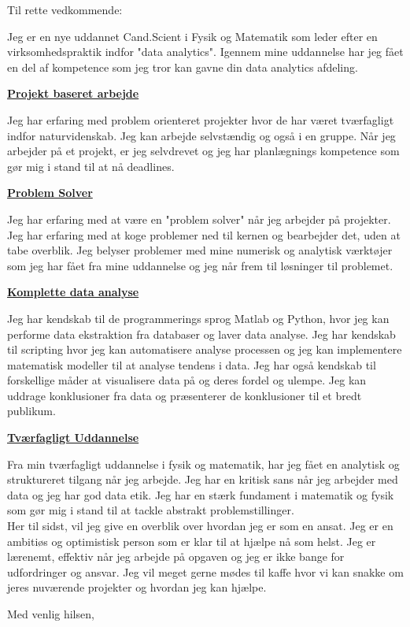 \documentclass[10pt,a4paper]{letter}
\begin{document}
\begin{letter}{}
\opening{Til rette vedkommende:}
Jeg er en nye uddannet Cand.Scient i Fysik og Matematik som leder efter en virksomhedspraktik indfor "data analytics". Igennem mine uddannelse har jeg fået en del af kompetence som jeg tror kan gavne din data analytics afdeling.

\underline{\textbf{Projekt baseret arbejde}}

Jeg har erfaring med problem orienteret projekter hvor de har været tværfagligt indfor naturvidenskab. Jeg kan arbejde selvstændig og også i en gruppe. Når jeg arbejder på et projekt, er jeg selvdrevet og jeg har planlægnings kompetence som gør mig i stand til at nå deadlines.   

 
\underline{\textbf{Problem Solver}}

Jeg har erfaring med at være en "problem solver" når jeg arbejder på projekter. Jeg har erfaring med at koge problemer ned til kernen og bearbejder det, uden at tabe overblik. Jeg belyser problemer med mine numerisk og analytisk værktøjer som jeg har fået fra mine uddannelse og jeg når frem til løsninger til problemet.
   

\underline{\textbf{Komplette data analyse}}

Jeg har kendskab til de programmerings sprog Matlab og Python, hvor jeg kan performe data ekstraktion fra databaser og laver data analyse. Jeg har kendskab til scripting hvor jeg kan automatisere analyse processen og jeg kan implementere matematisk modeller til at analyse tendens i data. Jeg har også kendskab til forskellige måder at visualisere data på og deres fordel og ulempe. Jeg kan uddrage konklusioner fra data og præsenterer de konklusioner til et bredt publikum. 


\underline{\textbf{Tværfagligt Uddannelse}}

Fra min tværfagligt uddannelse i fysik og matematik, har jeg fået en analytisk og struktureret tilgang når jeg arbejde. Jeg har en kritisk sans når jeg arbejder med data og jeg har god data etik. Jeg har en stærk fundament i matematik og fysik som gør mig i stand til at tackle abstrakt problemstillinger.  
\\

Her til sidst, vil jeg give en overblik over hvordan jeg er som en ansat. Jeg er en ambitiøs og optimistisk person som er klar til at hjælpe nå som helst. Jeg er lærenemt, effektiv når jeg arbejde på opgaven og jeg er ikke bange for udfordringer og ansvar. Jeg vil meget gerne mødes til kaffe hvor vi kan snakke om jeres nuværende projekter og hvordan jeg kan hjælpe.  
   
\closing{Med venlig hilsen,}

\end{letter}
\end{document}
